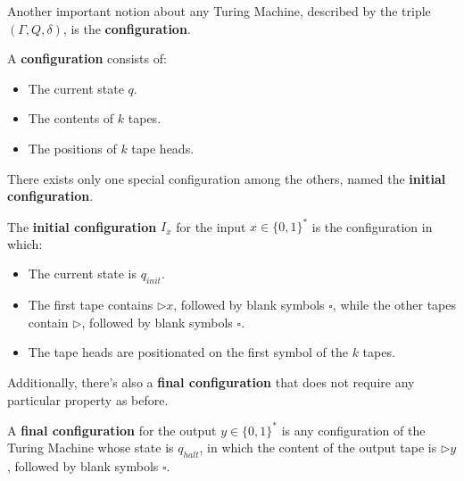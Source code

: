 Another important notion about any Turing Machine, described by the triple $(\Gamma,Q,\delta)$, is the \textbf{configuration}.
\begin{definition}
    A \textbf{configuration} consists of:
    \begin{itemize}
        \renewcommand{\labelitemi}{-}
        \item The current state $q$.
        \item The contents of $k$ tapes.
        \item The positions of $k$ tape heads.
    \end{itemize}
\end{definition}
There exists only one special configuration among the others, named the \textbf{initial configuration}.
\begin{definition}
    The \textbf{initial configuration} $I_x$ for the input $x \in \{0,1\}^*$ is the configuration in which:
    \begin{itemize}
        \renewcommand{\labelitemi}{-}
        \item The current state is $q_{init}$.
        \item The first tape contains $\triangleright x$, followed by blank symbols $\square$, while the other tapes contain $\triangleright$, followed by blank symbols $\square$.
        \item The tape heads are positionated on the first symbol of the $k$ tapes.
    \end{itemize}
\end{definition}
Additionally, there's also a \textbf{final configuration} that does not require any particular property as before.
\begin{definition}
    A \textbf{final configuration} for the output $y \in \{0,1\}^*$ is any configuration of the Turing Machine whose state is $q_{halt}$, in which the 
    content of the output tape is $\triangleright y$, followed by blank symbols $\square$.
\end{definition}